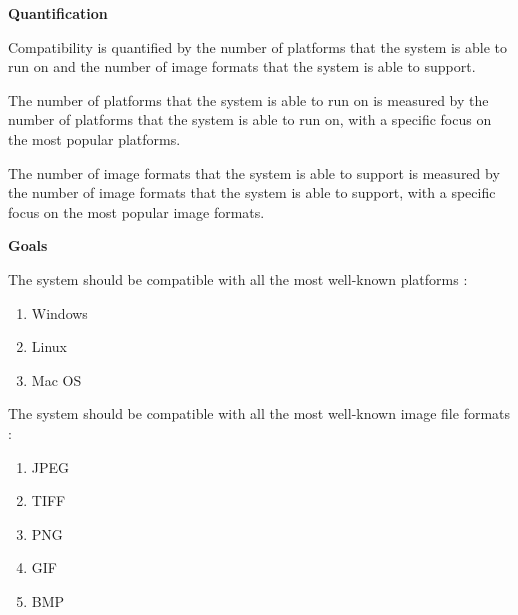 \documentclass[11pt,a4paper]{article}
\begin{document}
    {\bf Quantification}

Compatibility is quantified by the number of platforms that the system is able to run on and the number of image formats that the system is able to support.

The number of platforms that the system is able to run on is measured by the number of platforms that the system is able to run on, with a specific focus on the most popular platforms.

The number of image formats that the system is able to support is measured by the number of image formats that the system is able to support, with a specific focus on the most popular image formats.

    {\bf Goals}

The system should be compatible with all the most well-known platforms :
\begin{enumerate}
    \item Windows
    \item Linux
    \item Mac OS
\end{enumerate}

The system should be compatible with all the most well-known image file formats :
\begin{enumerate}
    \item JPEG
    \item TIFF
    \item PNG
    \item GIF
    \item BMP
\end{enumerate}
\end{document}
